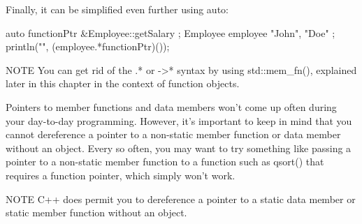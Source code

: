 Finally, it can be simplified even further using auto:

\begin{cpp}
auto functionPtr { &Employee::getSalary };
Employee employee { "John", "Doe" };
println("{}", (employee.*functionPtr)());
\end{cpp}

\begin{myNotic}{NOTE}
You can get rid of the .* or ->* syntax by using std::mem\_fn(), explained later in this chapter in the context of function objects.
\end{myNotic}

Pointers to member functions and data members won’t come up often during your day-to-day programming. However, it’s important to keep in mind that you cannot dereference a pointer to a non-static member function or data member without an object. Every so often, you may want to try something like passing a pointer to a non-static member function to a function such as qsort() that requires a function pointer, which simply won’t work.

\begin{myNotic}{NOTE}
C++ does permit you to dereference a pointer to a static data member or static member function without an object.
\end{myNotic}













